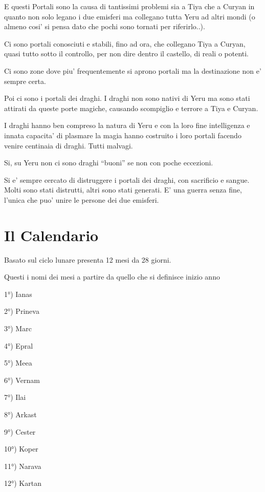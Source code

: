 \documentclass[a4paper,11pt,twoside,openany]{dndbook}
\begin{document}
E questi Portali sono la causa di tantissimi problemi sia a Tiya che a Curyan in quanto non solo legano i due emisferi ma collegano tutta Yeru ad altri mondi (o almeno cosi' si pensa dato che pochi sono tornati per riferirlo..).

Ci sono portali conosciuti e stabili, fino ad ora, che collegano Tiya a Curyan, quasi tutto sotto il controllo, per non dire dentro il castello, di reali o potenti.

Ci sono zone dove piu' frequentemente si aprono portali ma la destinazione non e' sempre certa.

Poi ci sono i portali dei draghi. I draghi non sono nativi di Yeru ma sono stati attirati da queste porte magiche, causando scompiglio e terrore a Tiya e Curyan.

I draghi hanno ben compreso la natura di Yeru e con la loro fine intelligenza e innata capacita' di plasmare la magia hanno costruito i loro portali facendo venire centinaia di draghi. Tutti malvagi.

Si, su Yeru non ci sono draghi ``buoni'' se non con poche eccezioni.

Si e' sempre cercato di distruggere i portali dei draghi, con sacrificio e sangue. Molti sono stati distrutti, altri sono stati generati. E' una guerra senza fine, l'unica che puo' unire le persone dei due emisferi. 

\pagebreak

\section{Il Calendario}

\label{il-calendario}

Basato sul ciclo lunare presenta 12 mesi da 28 giorni.

Questi i nomi dei mesi a partire da quello che si definisce inizio
anno
\bigskip

1°) Ianas

2°) Prineva

3°) Marc

4°) Epral

5°) Meea

6°) Vernam

7°) Ilai

8°) Arkast

9°) Cester

10°) Koper

11°) Narava

12°) Kartan
\end{document}
